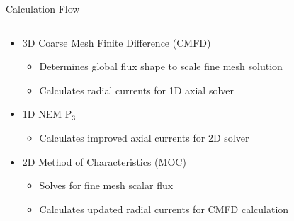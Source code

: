 \begin{frame}[t]{Calculation Flow}

\begin{columns}
  \begin{column}{0.6\textwidth}
    \begin{itemize}
      \item 3D Coarse Mesh Finite Difference (CMFD) \cite{SmithCMFDOrig}
      \begin{itemize}
        \item Determines global flux shape to scale fine mesh solution
        \item Calculates radial currents for 1D axial solver
      \end{itemize}
      \item 1D NEM-P$_3$ \cite{SPnEquations,finnemann1977RodCuspingOrigMention}
      \begin{itemize}
        \item Calculates improved axial currents for 2D solver
      \end{itemize}
      \item 2D Method of Characteristics (MOC) \cite{AskerMOCOrig1972,HalsallMOCOrigCACTUS1980}
      \begin{itemize}
        \item Solves for fine mesh scalar flux
        \item Calculates updated radial currents for CMFD calculation
      \end{itemize}
    \end{itemize}
  \end{column}
\begin{column}{0.4\textwidth}
  \begin{figure}[h]
    \centering
    \resizebox{!}{0.7\textheight}{}
  \end{figure}
\end{column}
\end{columns}

\end{frame}


